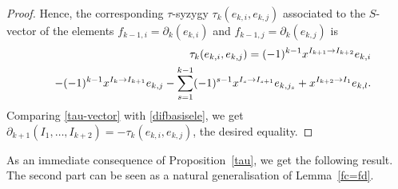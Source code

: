 \documentclass[10pt]{amsart}
\newcommand{\dif}{\mbox{$\partial$}}
\theoremstyle{definition}
\theoremstyle{remark}
\begin{document}
\begin{proof}
Hence, the corresponding $\tau$-syzygy $\tau_{k}(e_{k,i},e_{k,j})$
associated to the $S$-vector of the elements
$f_{k-1,i}=\dif_{k}(e_{k,i})$ and $f_{k-1,j}=\dif_{k}(e_{k,j})$ is
\begin{eqnarray}\label{tau-vector}
&& \tau_{k}(e_{k,i},e_{k,j})=(-1)^{k-1}x^{I_{k+1}\to
  I_{k+2}}e_{k,i}\\ && - (-1)^{k-1}x^{I_{k}\to
  I_{k+1}}e_{k,j} -\sum_{s=1}^{k-1}(-1)^{s-1}x^{I_s\to
  I_{s+1}}e_{k,j_s}+x^{I_{k+2}\to I_1}e_{k,l}. \notag
\end{eqnarray}
Comparing \eqref{tau-vector} with \eqref{difbasisele}, we get
$\dif_{k+1}(I_1,\ldots,I_{k+2})=-\tau_{k}(e_{k,i},e_{k,j})$, the
desired equality. 
\end{proof}

As an immediate consequence of Proposition~\ref{tau}, we get the
following result. The second part can be seen as a natural
generalisation of Lemma~\ref{fc=fd}.
\end{document}
